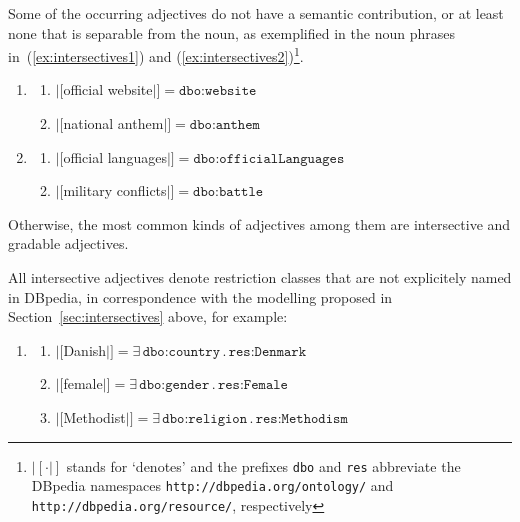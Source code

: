 \documentclass[11pt]{article}
\begin{document}
Some of the occurring adjectives do not have a semantic contribution, or at least none that is separable from the noun, 
as exemplified in the noun phrases in~(\ref{ex:intersectives1}) and (\ref{ex:intersectives2})\footnote{$|[\cdot|]$ stands for 
`denotes' and the prefixes \texttt{dbo} and \texttt{res} abbreviate the DBpedia namespaces \texttt{http://dbpedia.org/ontology/}
and \texttt{http://dbpedia.org/resource/}, respectively}.
\begin{enumerate}
\item \begin{enumerate}
 \item $|[$official website$|]=\texttt{dbo:website}$
 \item $|[$national anthem$|]=\texttt{dbo:anthem}$
 \end{enumerate}
 \label{ex:intersectives1}
\item \begin{enumerate}
 \item $|[$official languages$|]=\texttt{dbo:officialLanguages}$
 \item $|[$military conflicts$|]=\texttt{dbo:battle}$ 
 \end{enumerate}
 \label{ex:intersectives2}
\end{enumerate}

Otherwise, the most common kinds of adjectives among them are intersective and gradable adjectives.

All intersective adjectives denote restriction classes that are not explicitely named in DBpedia, 
in correspondence with the modelling proposed in Section~\ref{sec:intersectives} above, for example:
\begin{enumerate}
\item \begin{enumerate}
 \item $|[$Danish$|]=\exists\,\texttt{dbo:country}\,.\,\texttt{res:Denmark}$
 \item $|[$female$|]=\exists\,\texttt{dbo:gender}\,.\,\texttt{res:Female}$
 \item $|[$Methodist$|]=\exists\,\texttt{dbo:religion}\,.\,\texttt{res:Methodism}$
 \end{enumerate}
\end{enumerate}
\end{document}
